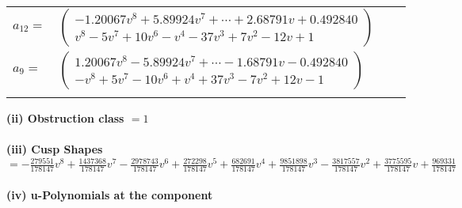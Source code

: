 \documentclass[1p]{elsarticle_modified}
\theoremstyle{definition}
\begin{document}
\begin{tabular}{m{7pt} m{180pt} m{7pt} m{180pt} }
\flushright $a_{12}=$&$\begin{pmatrix}-1.20067 v^{8}+5.89924 v^{7}+\cdots+2.68791 v+0.492840\\v^8-5 v^7+10 v^6- v^4-37 v^3+7 v^2-12 v+1\end{pmatrix}$ \\
\flushright $a_{9}=$&$\begin{pmatrix}1.20067 v^{8}-5.89924 v^{7}+\cdots-1.68791 v-0.492840\\- v^8+5 v^7-10 v^6+v^4+37 v^3-7 v^2+12 v-1\end{pmatrix}$\\&\end{tabular}
\flushleft \textbf{(ii) Obstruction class $= 1$}\\~\\
\flushleft \textbf{(iii) Cusp Shapes $= -\frac{279551}{178147} v^8+\frac{1437368}{178147} v^7-\frac{2978743}{178147} v^6+\frac{272298}{178147} v^5+\frac{682691}{178147} v^4+\frac{9851898}{178147} v^3-\frac{3817557}{178147} v^2+\frac{3775595}{178147} v+\frac{969331}{178147}$}\\~\\
\newpage\renewcommand{\arraystretch}{1}
\flushleft \textbf{(iv) u-Polynomials at the component}\newline \\
\end{document}
